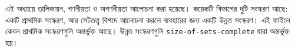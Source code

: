 \documentclass[../../../include/open-logic-chapter]{subfiles}
\begin{document}

\begin{editorial}
এই অধ্যায়ে তালিকায়ন, গণনীয়তা ও অগণনীয়তা আলোচনা করা হয়েছে।
কয়েকটি বিভাগের দুটি সংস্করণ আছে: একটি প্রাথমিক সংস্করণ, আর
সেটতত্ত্ব বিশদে আলোচনা করলে ব্যবহারের জন্য একটি উন্নত সংস্করণ।
এই ফাইলে কেবল প্রাথমিক সংস্করণগুলি অন্তর্ভুক্ত আছে।
উন্নত সংস্করণগুলি \verb|size-of-sets-complete| দ্বারা অন্তর্ভুক্ত হয়।
\end{editorial}











\OLEndChapterHook
\end{document}
